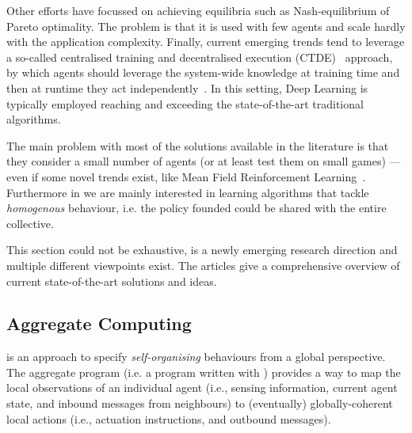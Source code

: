 \documentclass[11pt]{article}
\begin{document}
Other efforts have focussed on achieving equilibria such as Nash-equilibrium of Pareto optimality.
The problem is that it is used with few agents and scale hardly with the application complexity.
%
Finally, current emerging trends tend to leverage a so-called centralised training and decentralised execution (CTDE)~\cite{DBLP:journals/tcyb/NguyenNN20} approach, by which 
 agents should leverage the system-wide knowledge at training time and then at runtime they act independently~\cite{DBLP:journals/aamas/Hernandez-LealK19}. In this setting, Deep Learning is typically employed reaching and exceeding the state-of-the-art traditional \marl{} algorithms.
 
The main problem with most of the solutions available in the literature is that they consider a small number of agents (or at least test them on small games) --- even if some novel trends exist, like Mean Field Reinforcement Learning~\cite{DBLP:journals/corr/abs-2108-02731}.
Furthermore in \cpsw{} we are mainly interested in learning algorithms that tackle \emph{homogenous} behaviour, i.e. the policy founded could be shared with the entire collective.

This section could not be exhaustive, \marl{} is a newly emerging research direction and multiple different viewpoints exist. The articles \cite{DBLP:journals/aamas/Hernandez-LealK19, DBLP:journals/corr/abs-1911-10635, DBLP:journals/corr/abs-1908-03963} give a comprehensive overview of current state-of-the-art solutions and ideas.
\subsection{Aggregate Computing}

\ac{} is an approach to specify \emph{self-organising} behaviours from a global perspective.
%
The aggregate program (i.e. a program written with \ac{}) provides a way to map the local observations of an individual agent (i.e., sensing information, current agent state, and inbound messages from neighbours) to (eventually) globally-coherent local actions
 (i.e., actuation instructions, and outbound messages).
%
\end{document}
